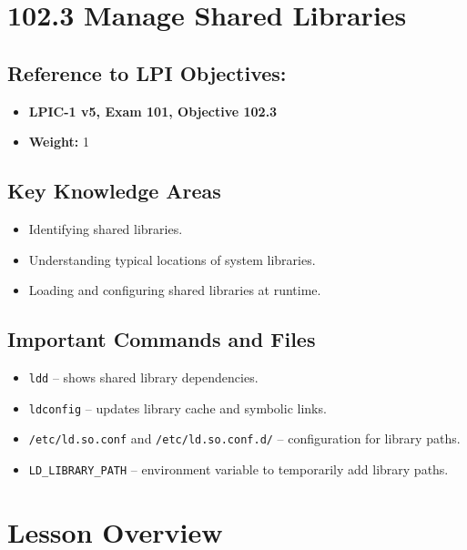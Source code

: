 \documentclass[a4paper]{report}
\begin{document}


\newpage

\section*{102.3 Manage Shared Libraries}

\subsection*{Reference to LPI Objectives:}
\begin{itemize}
    \item \textbf{LPIC-1 v5, Exam 101, Objective 102.3}
    \item \textbf{Weight:} 1
\end{itemize}

\subsection*{Key Knowledge Areas}
\begin{itemize}
    \item Identifying shared libraries.
    \item Understanding typical locations of system libraries.
    \item Loading and configuring shared libraries at runtime.
\end{itemize}

\subsection*{Important Commands and Files}
\begin{itemize}
    \item \texttt{ldd} – shows shared library dependencies.
    \item \texttt{ldconfig} – updates library cache and symbolic links.
    \item \texttt{/etc/ld.so.conf} and \texttt{/etc/ld.so.conf.d/} – configuration for library paths.
    \item \texttt{LD\_LIBRARY\_PATH} – environment variable to temporarily add library paths.
\end{itemize}

\section*{Lesson Overview}
\end{document}
